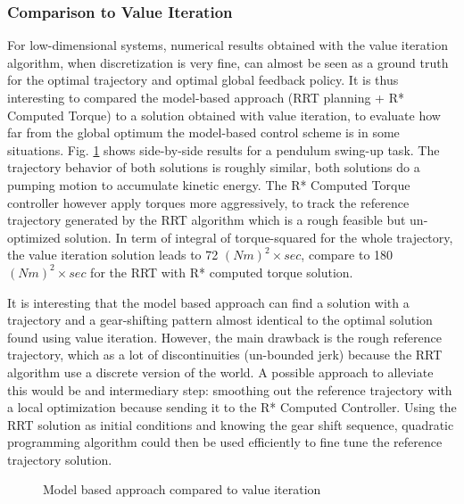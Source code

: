 \subsubsection{Comparison to Value Iteration}

For low-dimensional systems, numerical results obtained with the value iteration algorithm, when discretization is very fine, can almost be seen as a ground truth for the optimal trajectory and optimal global feedback policy. It is thus interesting to compared the model-based approach (RRT planning + R* Computed Torque) to a solution obtained with value iteration, to evaluate how far from the global optimum the model-based control scheme is in some situations. Fig. \ref{fig:vs} shows side-by-side results for a pendulum swing-up task. The trajectory behavior of both solutions is roughly similar, both solutions do a pumping motion to accumulate kinetic energy. The R* Computed Torque controller however apply torques more aggressively, to track the reference trajectory generated by the RRT algorithm which is a rough feasible but un-optimized solution. In term of integral of torque-squared for the whole trajectory, the value iteration solution leads to 72 $\left(Nm\right)^2 \times sec$, compare to 180 $\left(Nm\right)^2 \times sec$ for the RRT with R* computed torque solution.

It is interesting that the model based approach can find a solution with a trajectory and a gear-shifting pattern almost identical to the optimal solution found using value iteration. However, the main drawback is the rough reference trajectory, which as a lot of discontinuities (un-bounded jerk) because the RRT algorithm use a discrete version of the world. A possible approach to alleviate this would be and intermediary step: smoothing out the reference trajectory with a local optimization because sending it to the R* Computed Controller. Using the RRT solution as initial conditions and knowing the gear shift sequence, quadratic programming algorithm could then be used efficiently to fine tune the reference trajectory solution.

\begin{figure}[H]
        \centering
        \caption{Model based approach compared to value iteration}
				\label{fig:vs}
\end{figure}


